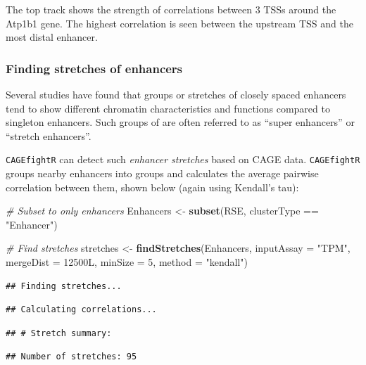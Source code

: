 \documentclass[9pt,a4paper,]{extarticle}
\newenvironment{Shaded}{\begin{snugshade}}{\end{snugshade}}
\newcommand{\KeywordTok}[1]{\textcolor[rgb]{0.13,0.29,0.53}{\textbf{{#1}}}}
\newcommand{\DataTypeTok}[1]{\textcolor[rgb]{0.13,0.29,0.53}{{#1}}}
\newcommand{\DecValTok}[1]{\textcolor[rgb]{0.00,0.00,0.81}{{#1}}}
\newcommand{\StringTok}[1]{\textcolor[rgb]{0.31,0.60,0.02}{{#1}}}
\newcommand{\CommentTok}[1]{\textcolor[rgb]{0.56,0.35,0.01}{\textit{{#1}}}}
\newcommand{\NormalTok}[1]{{#1}}
\begin{document}
The top track shows the strength of correlations between 3 TSSs around the Atp1b1 gene. The highest correlation is seen between the upstream TSS and the most distal enhancer.

\subsubsection{Finding stretches of enhancers}\label{finding-stretches-of-enhancers}

Several studies have found that groups or stretches of closely spaced enhancers tend to show different chromatin characteristics and functions compared to singleton enhancers. Such groups of are often referred to as ``super enhancers'' or ``stretch enhancers''\citep{Pott2015}.

\texttt{CAGEfightR} can detect such \emph{enhancer stretches} based on CAGE data. \texttt{CAGEfightR} groups nearby enhancers into groups and calculates the average pairwise correlation between them, shown below (again using Kendall's tau):

\begin{Shaded}
\begin{Highlighting}[]
\CommentTok{# Subset to only enhancers}
\NormalTok{Enhancers <-}\StringTok{ }\KeywordTok{subset}\NormalTok{(RSE, clusterType ==}\StringTok{ "Enhancer"}\NormalTok{)}

\CommentTok{# Find stretches}
\NormalTok{stretches <-}\StringTok{ }\KeywordTok{findStretches}\NormalTok{(Enhancers, }
                           \DataTypeTok{inputAssay =} \StringTok{"TPM"}\NormalTok{,}
                           \DataTypeTok{mergeDist =} \NormalTok{12500L,}
                           \DataTypeTok{minSize =} \DecValTok{5}\NormalTok{,}
                           \DataTypeTok{method =} \StringTok{"kendall"}\NormalTok{)}
\end{Highlighting}
\end{Shaded}

\begin{verbatim}
## Finding stretches...
\end{verbatim}

\begin{verbatim}
## Calculating correlations...
\end{verbatim}

\begin{verbatim}
## # Stretch summary:
\end{verbatim}

\begin{verbatim}
## Number of stretches: 95
\end{verbatim}
\end{document}
